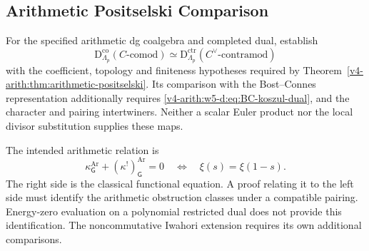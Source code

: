\subsection{Arithmetic Positselski Comparison}
\label{v4-arith:w5-d:combined:closure}
\begin{question}
\label{v4-arith:w5-d:combined:thm:closure}
For the specified arithmetic dg coalgebra and completed dual, establish
\begin{equation}
\label{v4-arith:w5-d:eq:arith-positselski-closure}
 \mathrm D^{\mathrm{co}}_{\Lambda_p}(C\text{-}\mathrm{comod})
 \simeq
 \mathrm D^{\mathrm{ctr}}_{\Lambda_p}(C^\vee\text{-}\mathrm{contramod})
\end{equation}
with the coefficient, topology and finiteness hypotheses required by
Theorem~\ref{v4-arith:thm:arithmetic-positselski}. Its comparison with the
Bost--Connes representation additionally requires
\eqref{v4-arith:w5-d:eq:BC-koszul-dual}, and the character and pairing
intertwiners. Neither a scalar Euler product nor the local divisor
substitution supplies these maps.
\end{question}

\begin{question}
\label{v4-arith:w5-d:combined:cor:G-row-upgrade}
The intended arithmetic relation is
\begin{equation}
\label{v4-arith:w5-d:eq:G-row-biconditional}
 \kappa^{\mathrm{Ar}}_{\mathsf G}+(\kappa^!)^{\mathrm{Ar}}_{\mathsf G}=0
 \quad\Longleftrightarrow\quad \xi(s)=\xi(1-s).
\end{equation}
The right side is the classical functional equation. A proof relating
it to the left side must identify the arithmetic obstruction classes
under a compatible pairing. Energy-zero evaluation on a polynomial
restricted dual does not provide this identification. The noncommutative
Iwahori extension requires its own additional comparisons.
\end{question}

